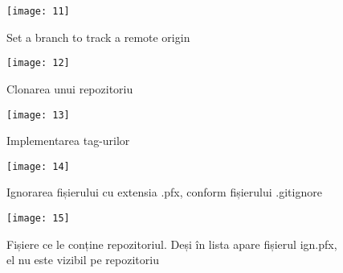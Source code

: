 \begin{figure}[h]
\texttt{[image: 11]}
\caption{Set a branch to track a remote origin}
\label{fig:9}
\end{figure}

\begin{figure}[h]
\texttt{[image: 12]}
\caption{Clonarea unui repozitoriu}
\label{fig:10}
\end{figure}

\begin{figure}[h]
\texttt{[image: 13]}
\caption{Implementarea tag-urilor}
\label{fig:11}
\end{figure}

\begin{figure}[h]
\texttt{[image: 14]}
\caption{Ignorarea fișierului cu extensia .pfx, conform fișierului .gitignore}
\label{fig:12}
\end{figure}

\begin{figure}[h]
\texttt{[image: 15]}
\caption{Fișiere ce le conține repozitoriul. Deși în lista apare fișierul ign.pfx, el nu este vizibil pe repozitoriu}
\label{fig:13}
\end{figure}

\clearpage